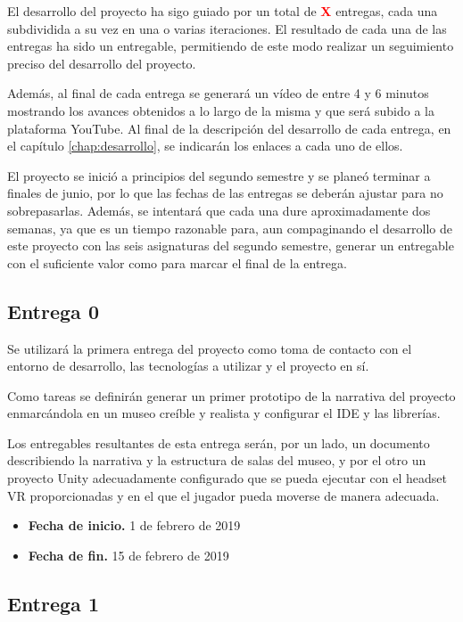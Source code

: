 El desarrollo del proyecto ha sigo guiado por un total de \textbf{\textcolor{red}{X}} entregas, cada una subdividida a su vez en una o varias iteraciones. El resultado de cada una de las entregas ha sido un entregable, permitiendo de este modo realizar un seguimiento preciso del desarrollo del proyecto.

Además, al final de cada entrega se generará un vídeo de entre 4 y 6 minutos mostrando los avances obtenidos a lo largo de la misma y que será subido a la plataforma YouTube. Al final de la descripción del desarrollo de cada entrega, en el capítulo \ref{chap:desarrollo}, se indicarán los enlaces  a cada uno de ellos.

El proyecto se inició a principios del segundo semestre y se planeó terminar a finales de junio, por lo que las fechas de las entregas se deberán ajustar para no sobrepasarlas. Además, se intentará que cada una dure aproximadamente dos semanas, ya que es un tiempo razonable para, aun compaginando el desarrollo de este proyecto con las seis asignaturas del segundo semestre, generar un entregable con el suficiente valor como para marcar el final de la entrega.

\subsection{Entrega 0}

Se utilizará la primera entrega del proyecto como toma de contacto con el entorno de desarrollo, las tecnologías a utilizar y el proyecto en sí.

Como tareas se definirán generar un primer prototipo de la narrativa del proyecto enmarcándola en un museo creíble y realista y configurar el \acs{IDE} y las librerías.

Los entregables resultantes de esta entrega serán, por un lado, un documento describiendo la narrativa y la estructura de salas del museo, y por el otro un proyecto Unity adecuadamente configurado que se pueda ejecutar con el headset \acs{VR} proporcionadas y en el que el jugador pueda moverse de manera adecuada.

\begin{itemize}
    \item \textbf{Fecha de inicio.} 1 de febrero de 2019
    \item \textbf{Fecha de fin.} 15 de febrero de 2019
\end{itemize}

\subsection{Entrega 1}

